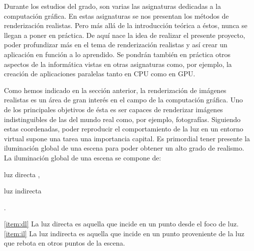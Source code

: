 \documentclass[titlepage,12pt]{report}
\begin{document}
Durante los estudios del grado, son varias las asignaturas dedicadas a la computación gráfica. En estas asignaturas se nos presentan los métodos de renderización realistas. Pero más allá de la introducción teórica a éstos, nunca se llegan a poner en práctica. De aquí nace la idea de realizar el presente proyecto, poder profundizar más en el tema de renderización realistas y así crear un aplicación en función a lo aprendido. Se pondrán también en práctica otros aspectos de la informática vistas en otras asignaturas como, por ejemplo, la creación de aplicaciones paralelas tanto en CPU como en GPU.

Como hemos indicado en la sección anterior, la renderización de imágenes realistas es un área de gran interés en el campo de la computación gráfica. Uno de los principales objetivos de ésta es ser capaces de renderizar imágenes indistinguibles de las del mundo real como, por ejemplo, fotografías. Siguiendo estas coordenadas, poder reproducir el comportamiento de la luz en un entorno virtual supone una tarea una importancia capital. Es primordial tener presente la iluminación global de una escena para poder obtener un alto grado de realismo. La iluminación global de una escena se compone de: \begin{enumerate*}[label=\roman*)] \item luz directa \label{item:dl}, \item luz indirecta \label{item:il} \end{enumerate*}.

\ref{item:dl} La luz directa es aquella que incide en un punto desde el foco de luz. \\
\ref{item:il} La luz indirecta es aquella que incide en un punto proveniente de la luz que rebota en otros puntos de la escena.
\end{document}
